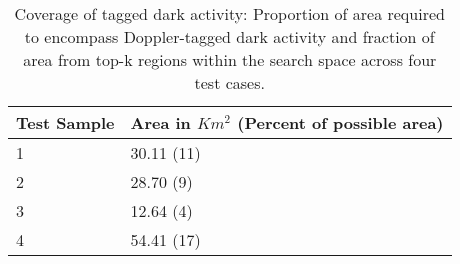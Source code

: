 \begin{table}[h!]

\begin{tabular}{|l|l|}

\hline
\textbf{Test Sample} & \textbf{Area in $Km^2$ (Percent of possible area)} \\ \hline
1                    & 30.11 (11)                                                        \\ \hline
2                    & 28.70 (9)                                                         \\ \hline
3                    & 12.64 (4)                                                         \\ \hline
4                    & 54.41 (17)                                                        \\ \hline
\end{tabular}
\caption{Coverage of tagged dark activity: Proportion of area required to encompass Doppler-tagged dark activity and fraction of area from top-k regions within the search space across four test cases.}
\label{app:tab:dgv}
\end{table}

